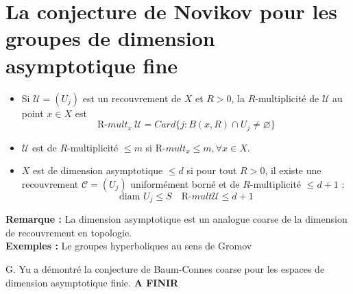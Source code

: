 \documentclass{beamer}
\begin{document}
\section{La conjecture de Novikov pour les groupes de dimension asymptotique fine}

\begin{frame}
\begin{definition}
\begin{itemize}
\item Si $\mathcal U=(U_j)$ est un recouvrement de $X$ et $R>0$, la $R$-multiplicité de $\mathcal U$ au point $x\in X$ est
\[\text{R-}mult_x\ \mathcal U=Card\{j : B(x,R)\cap U_j \neq \varnothing\}\]
\item $\mathcal U $ est de $R$-multiplicité $\leq m$ si $\text{R-}mult_x\leq m,\forall x\in X$.
\item $X$ est de dimension asymptotique $\leq d$ si pour tout $R>0$, il existe une recouvrement $\mathcal C=(U_j)$ uniformément borné et de $R$-multiplicité $\leq d+1$ :
\[\text{diam }U_j \leq S\quad \text{R-}mult \mathcal U \leq d+1\]
\end{itemize}
\end{definition}
\textbf{Remarque :} La dimension asymptotique est un analogue coarse de la dimension de recouvrement en topologie.\\
\textbf{Exemples :} Le groupes hyperboliques au sens de Gromov
\end{frame}

\begin{frame}
G. Yu a démontré la conjecture de Baum-Connes coarse pour les espaces de dimension asymptotique finie.
\textbf{A FINIR}
\end{frame}
\end{document}

